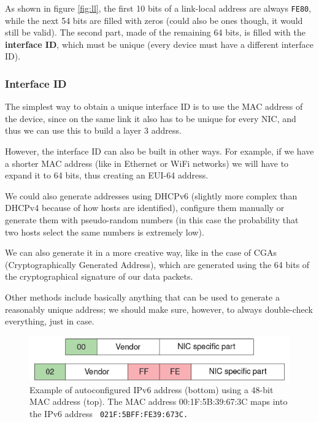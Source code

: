 As shown in figure \ref{fig:ll}, the first 10 bits of a link-local address are always \texttt{FE80}, while the next 54 bits are filled with zeros (could also be ones though, it would still be valid). The second part, made of the remaining 64 bits, is filled with the \textbf{interface ID}, which must be unique (every device must have a different interface ID).


\subsubsection{Interface ID}
The simplest way to obtain a unique interface ID is to use the MAC address of the device, since on the same link it also has to be unique for every NIC, and thus we can use this to build a layer 3 address.

However, the interface ID can also be built in other ways. For example, if we have a shorter MAC address (like in Ethernet or WiFi networks) we will have to expand it to 64 bits, thus creating an EUI-64 address.

We could also generate addresses using DHCPv6 (slightly more complex than DHCPv4 because of how hosts are identified), configure them manually or generate them with pseudo-random numbers (in this case the probability that two hosts select the same numbers is extremely low).

We can also generate it in a more creative way, like in the case of CGAs (Cryptographically Generated Address), which are generated using the 64 bits of the cryptographical signature of our data packets.

Other methods include basically anything that can be used to generate a reasonably unique address; we should make sure, however, to always double-check everything, just in case.

\begin{figure}[h]
    \centering
    \includegraphics[scale=1]{img/autonconfexample.png}
    \decoRule
    \caption{Example of autoconfigured IPv6 address (bottom) using a 48-bit MAC address (top). The MAC address 00:1F:5B:39:67:3C maps into the IPv6 address \texttt{{\color{red} 02}1F:5B{\color{red}FF:FE}39:673C.}}
    \label{fig:autonconfexample}
\end{figure}

